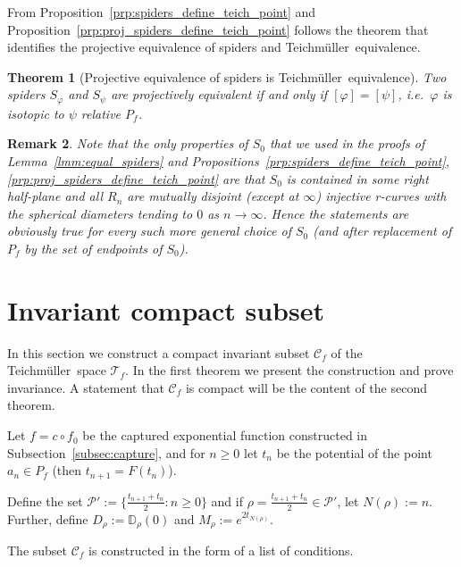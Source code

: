 \documentclass[10pt,reqno,a4paper]{amsart}
\numberwithin{figure}{section}
\numberwithin{equation}{section}
\newtheorem{thm}{Theorem}[section]
\newtheorem{remark}[thm]{Remark}
\newcommand{\tei}{Teichm\"uller}
\begin{document}
From Proposition~\ref{prp:spiders_define_teich_point} and Proposition~\ref{prp:proj_spiders_define_teich_point} follows the theorem that identifies the projective equivalence of spiders and \tei\ equivalence.

\begin{thm}[Projective equivalence of spiders is \tei\ equivalence]
	\label{thm:W_define_teich_point}
	Two spiders $S_\varphi$ and $S_\psi$ are projectively equivalent if and only if $[\varphi]=[\psi]$, i.e.\ $\varphi$ is isotopic to $\psi$ relative ${P_f}$.
\end{thm}

\begin{remark}
	Note that the only properties of $S_0$ that we used in the proofs of Lemma~\ref{lmm:equal_spiders} and Propositions~\ref{prp:spiders_define_teich_point}, \ref{prp:proj_spiders_define_teich_point} are that $S_0$ is contained in some right half-plane and all $R_n$ are mutually disjoint (except at $\infty$) injective r-curves with the spherical diameters tending to $0$ as $n\to\infty$. Hence the statements are obviously true for every such more general choice of $S_0$ (and after replacement of $P_f$ by the set of endpoints of $S_0$).
\end{remark}

\section{Invariant compact subset}

\label{sec:inv_compact_subset}

In this section we construct a compact invariant subset $\mathcal{C}_f$ of the \tei\ space $\mathcal{T}_f$. In the first theorem we present the construction and prove invariance. A statement that $\mathcal{C}_f$ is compact will be the content of the second theorem.

Let $f=c\circ f_0$ be the captured exponential function constructed in Subsection~\ref{subsec:capture}, and for $n\geq 0$ let $t_n$ be the potential of the point $a_n\in P_f$ (then $t_{n+1}=F(t_n)$).

Define the set $\mathcal{P}':=\{\frac{t_{n+1}+t_n}{2}: n\geq 0\}$ and if $\rho=\frac{t_{n+1}+t_n}{2}\in\mathcal{P}'$, let $N(\rho):=n$. Further, define $D_\rho:=\mathbb{D}_\rho(0)$ and $M_\rho:=e^{2t_{N(\rho)}}$.

The subset $\mathcal{C}_f$ is constructed in the form of a list of conditions.
\end{document}
